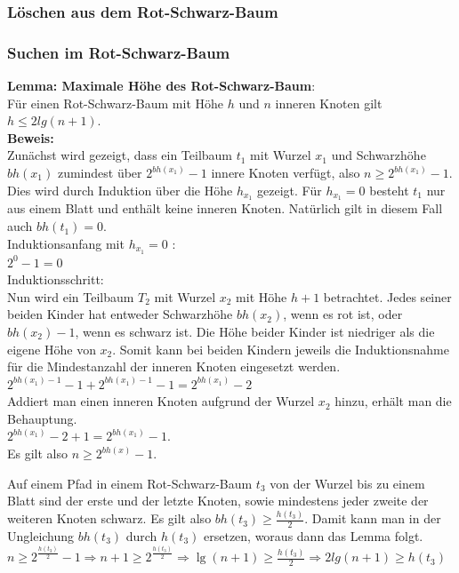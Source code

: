 \documentclass[a4paper,12pt]{article}
\begin{document}
   
\subsubsection{Löschen aus dem Rot-Schwarz-Baum}

\subsubsection{Suchen im Rot-Schwarz-Baum}


\noindent\textbf{Lemma: Maximale Höhe des Rot-Schwarz-Baum}:\\
Für einen Rot-Schwarz-Baum mit Höhe $h$ und $n$ inneren Knoten gilt $h \leq  2 lg(n + 1)$. \\
\noindent\textbf{Beweis:}\\
Zunächst wird gezeigt, dass ein Teilbaum $t_1$ mit Wurzel $x_1$ und Schwarzhöhe $\mathit{bh(x_1)}$ zumindest über $2^{bh(x_1)} - 1$ innere Knoten verfügt, also $n \geq 2^{bh(x_1)} - 1 $. Dies wird durch Induktion über die Höhe $\mathit{h_{x_1}}$ gezeigt. Für $\mathit{h_{x_1}} = 0$ besteht $t_1$ nur aus einem Blatt und enthält keine inneren Knoten. Natürlich gilt in diesem Fall auch $\mathit{bh(t_1) = 0}$.  \\
Induktionsanfang mit $\mathit{h_{x_1} = 0}$ :\\
$2^{0} - 1 = 0$\\
Induktionsschritt:\\
Nun wird ein Teilbaum $T_2$ mit Wurzel $x_2$ mit Höhe $h + 1$ betrachtet. Jedes seiner beiden Kinder hat entweder Schwarzhöhe  $\mathit{bh(x_2)}$, wenn es rot ist, oder $\mathit{bh(x_2) - 1}$, wenn es schwarz ist. Die Höhe beider Kinder ist niedriger als die eigene Höhe von $x_2$. Somit kann bei beiden Kindern jeweils die Induktionsnahme für die Mindestanzahl der inneren Knoten eingesetzt werden.   \\
$2^{bh(x_1)-1} - 1 + 2^{bh(x_1)-1} - 1  = 2^{bh(x_1)} - 2 $ \\
Addiert man einen inneren Knoten aufgrund der Wurzel $x_2$ hinzu, erhält man die Behauptung.\\
$2^{bh(x_1)} - 2 + 1 = 2^{bh(x_1)} - 1 $.\\
Es gilt also $n \geq 2^{\mathit{bh(x)}} - 1$.

\noindent Auf einem Pfad in einem Rot-Schwarz-Baum $t_3$ von der Wurzel bis zu einem Blatt sind der erste und der letzte Knoten, sowie mindestens jeder zweite der weiteren Knoten schwarz. Es gilt also $\mathit{bh(t_3)} \geq \frac{h(t_3)}{2}$. 
Damit kann man in der Ungleichung $\mathit{bh(t_3)}$ durch $\mathit{h(t_3)}$ ersetzen, woraus dann das Lemma folgt.\\
$n \geq 2^{\frac{\mathit{h(t_3)}}{2}} - 1 \Rightarrow n + 1 \geq 2^{\frac{\mathit{h(t_3)}}{2}} \Rightarrow
\lg(n + 1) \geq \frac{h(t_3)}{2} \Rightarrow 2 lg(n + 1) \geq h(t_3) $ 



\newpage


\end{document}
